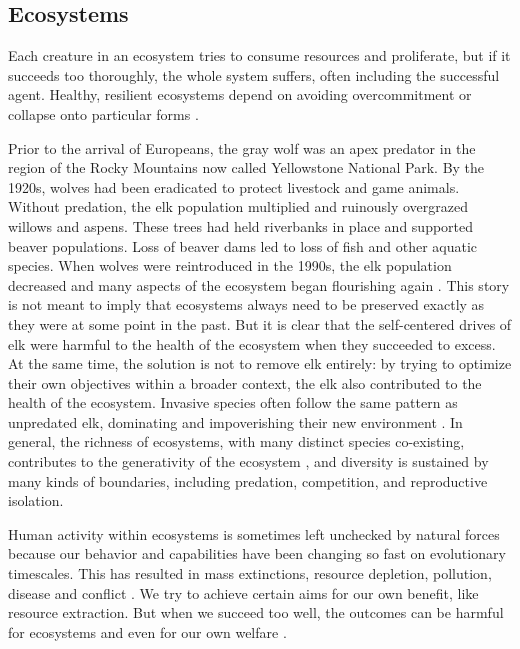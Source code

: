 \documentclass[12pt]{article}
\begin{document}
\subsection{Ecosystems}

Each creature in an ecosystem tries to consume resources and proliferate, but if it succeeds too thoroughly, the whole system suffers, often including the successful agent. Healthy, resilient ecosystems depend on avoiding overcommitment or collapse onto particular forms \citep{holling1973resilience, yachi1999biodiversity}.

Prior to the arrival of Europeans, the gray wolf was an apex predator in the region of the Rocky Mountains now called Yellowstone National Park. By the 1920s, wolves had been eradicated to protect livestock and game animals. Without predation, the elk population multiplied and ruinously overgrazed willows and aspens. These trees had held riverbanks in place and supported beaver populations. Loss of beaver dams led to loss of fish and other aquatic species. When wolves were reintroduced in the 1990s, the elk population decreased and many aspects of the ecosystem began flourishing again \citep{ripple2012trophic}. This story is not meant to imply that ecosystems always need to be preserved exactly as they were at some point in the past. But it is clear that the self-centered drives of elk were harmful to the health of the ecosystem when they succeeded to excess. At the same time, the solution is not to remove elk entirely: by trying to optimize their own objectives within a broader context, the elk also contributed to the health of the ecosystem. Invasive species often follow the same pattern as unpredated elk, dominating and impoverishing their new environment \citep{pimentel2005update}. In general, the richness of ecosystems, with many distinct species co-existing, contributes to the generativity of the ecosystem \citep{hutchinson1959homage, tilman1982resource, schluter2000ecology, seehausen2014genomics}, and diversity is sustained by many kinds of boundaries, including predation, competition, and reproductive isolation. 




Human activity within ecosystems is sometimes left unchecked by natural forces because our behavior and capabilities have been changing so fast on evolutionary timescales. This has resulted in mass extinctions, resource depletion, pollution, disease and conflict \citep{ceballos2015accelerated, kolbert2014sixth, rockstrom2009safe}. We try to achieve certain aims for our own benefit, like resource extraction. But when we succeed too well, the outcomes can be harmful for ecosystems and even for our own welfare \citep{shiva1993monocultures, bateson1972steps}.
\end{document}
